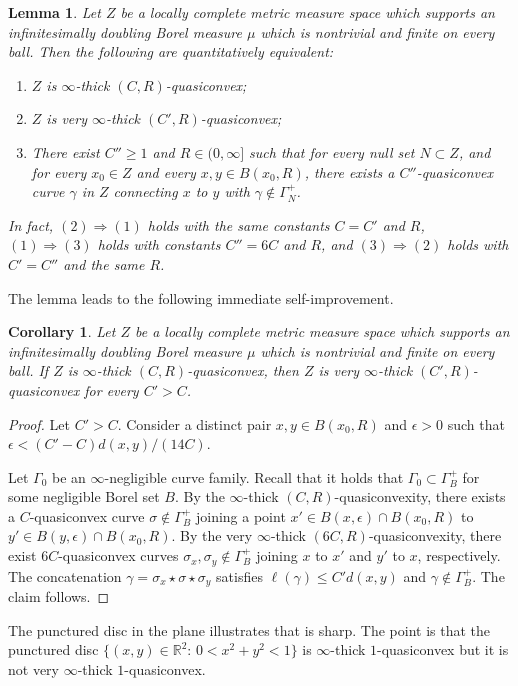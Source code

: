 \documentclass[reqno]{amsart}
\numberwithin{equation}{section}
\newtheorem{corollary}[theorem]{Corollary}
\newtheorem{lemma}[theorem]{Lemma}
\theoremstyle{remark}
\newcommand{\R}{\mathbb{R}}
\begin{document}
\begin{lemma}\label{thm:very_thick-iff-infty-thick}
Let $Z$ be a locally complete metric measure space which supports an infinitesimally doubling Borel measure $\mu$ which is nontrivial and finite on every ball. Then the following are quantitatively equivalent:
\begin{enumerate}
    \item  $Z$ is $\infty$-thick $(C, R)$-quasiconvex;
    \item  $Z$ is very $\infty$-thick $(C', R)$-quasiconvex;
    \item  There exist $C''\geq 1$ and $R\in(0, \infty]$ such that for every null set $N\subset Z$, and for every $x_0\in Z$ and every $x, y\in B(x_0, R)$, there exists a $C''$-quasiconvex curve $\gamma$ in $Z$ connecting $x$ to $y$ with $\gamma\notin\Gamma_N^+$.
\end{enumerate}
In fact, $(2) \Rightarrow (1)$ holds with the same constants $C = C'$ and $R$, $(1) \Rightarrow (3)$ holds with constants $C'' = 6C$ and $R$, and $(3) \Rightarrow (2)$ holds with $C' = C''$ and the same $R$.
\end{lemma}






The lemma leads to the following immediate self-improvement.
\begin{corollary}\label{cor:thick-to-very-thick}
Let $Z$ be a locally complete metric measure space which supports an infinitesimally doubling Borel measure $\mu$ which is nontrivial and finite on every ball. If $Z$ is $\infty$-thick $(C,R)$-quasiconvex, then $Z$ is very $\infty$-thick $(C',R)$-quasiconvex for every $C' > C$.  
\end{corollary}
\begin{proof}
Let $C' > C$. Consider a distinct pair $x, y \in B( x_0, R )$ and $\epsilon > 0$ such that $\epsilon < ( C'-C)d(x,y)/(14C)$.

Let $\Gamma_0$ be an $\infty$-negligible curve family. Recall that it holds that $\Gamma_0 \subset \Gamma^{+}_{B}$ for some negligible Borel set $B$. By the $\infty$-thick $(C,R)$-quasiconvexity, there exists a $C$-quasiconvex curve $\sigma \not\in \Gamma^{+}_{B}$ joining a point $x'\in B( x, \epsilon ) \cap B( x_0, R )$ to $y'\in B( y, \epsilon ) \cap B( x_0, R )$. By the very $\infty$-thick $( 6C, R )$-quasiconvexity, there exist $6C$-quasiconvex curves $\sigma_x, \sigma_y \not\in \Gamma^{+}_{B}$ joining $x$ to $x'$ and $y'$ to $x$, respectively. The concatenation $\gamma = \sigma_x \star \sigma \star \sigma_y$ satisfies $\ell( \gamma ) \leq C' d(x,y)$ and $\gamma \not\in \Gamma^{+}_{B}$. The claim follows.
\end{proof}
The punctured disc in the plane illustrates that  is sharp. The point is that the punctured disc $\{(x,y)\in\R^2:\, 0<x^2+y^2<1\}$ is $\infty$-thick $1$-quasiconvex but it is not very $\infty$-thick $1$-quasiconvex.
\end{document}
